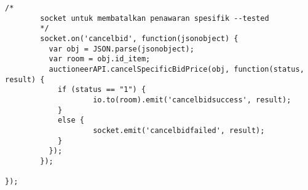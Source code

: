 \begin{lstlisting}[label=sc-socket-bid,style=htmlcssjs,caption=Kode Sumber Implementasi Node.js + Socket.io untuk Lelang]
        /*
        socket untuk membatalkan penawaran spesifik --tested
        */
        socket.on('cancelbid', function(jsonobject) {
          var obj = JSON.parse(jsonobject);
          var room = obj.id_item;
          auctioneerAPI.cancelSpecificBidPrice(obj, function(status, result) {
            if (status == "1") {
                    io.to(room).emit('cancelbidsuccess', result);
            }
            else {
                    socket.emit('cancelbidfailed', result);
            }
          });
        });

});

\end{lstlisting}